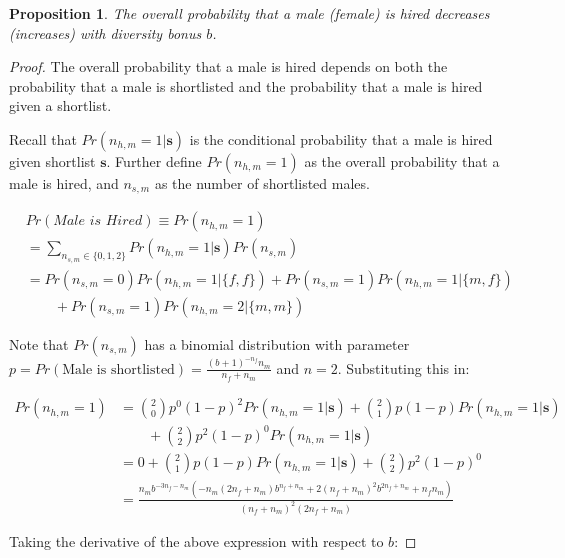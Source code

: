 \documentclass[11pt]{article}
\newtheorem{proposition}{Proposition}
\begin{document}
\begin{proposition}
    The overall probability that a male (female) is hired decreases (increases) with diversity bonus $b$.
\end{proposition}

\begin{proof}
    The overall probability that a male is hired depends on both the probability that a male is shortlisted and the probability that a male is hired given a shortlist.

    Recall that $Pr(n_{h,m}=1|\bm{s})$ is the conditional probability that a male is hired given shortlist $\bm{s}$. Further define $Pr(n_{h,m}=1)$ as the overall probability that a male is hired, and $n_{s,m}$ as the number of shortlisted males.

    \begin{align*}
         & Pr(\textit{Male is Hired}) \equiv Pr(n_{h,m}=1)                               \\
         & = \sum\nolimits_{n_{s,m} \in \{0,1,2\}} Pr(n_{h,m}=1|\bm{s}) Pr(n_{s,m})      \\
         & = Pr(n_{s,m} = 0)Pr(n_{h,m}=1|\{f,f\}) + Pr(n_{s,m} = 1)Pr(n_{h,m}=1|\{m,f\}) \\
         & \qquad + Pr(n_{s,m} = 1)Pr(n_{h,m}=2|\{m,m\})
    \end{align*}

    Note that $Pr(n_{s,m})$ has a binomial distribution with parameter $p=Pr(\text{Male is shortlisted})=\frac{(b+1)^{-n_f} n_m}{n_f+n_m}$ and $n=2$. Substituting this in:

    \begin{align*}
        Pr(n_{h,m}=1) & = \binom{2}{0}p^0(1-p)^2 Pr(n_{h,m}=1|\bm{s}) +  \binom{2}{1}p(1-p) Pr(n_{h,m}=1|\bm{s})                                           \\
                      & \qquad + \binom{2}{2}p^2(1-p)^0 Pr(n_{h,m}=1|\bm{s})                                                                               \\
                      & =  0 + \binom{2}{1}p(1-p) Pr(n_{h,m}=1|\bm{s}) + \binom{2}{2}p^2(1-p)^0                                                            \\
                      & = \frac{n_m b^{-3 n_f-n_m} \left(-n_m (2 n_f+n_m) b^{n_f+n_m}+2 (n_f+n_m)^2 b^{2 n_f+n_m}+n_f n_m\right)}{(n_f+n_m)^2 (2 n_f+n_m)}
    \end{align*}

    Taking the derivative of the above expression with respect to $b$:


\end{proof}
\end{document}
